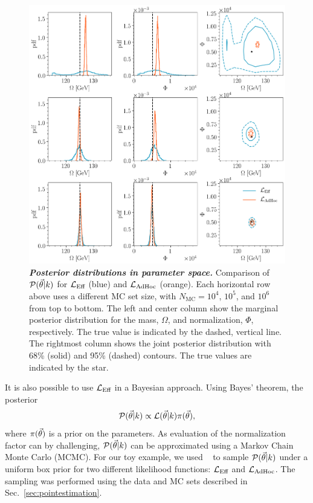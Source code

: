 \begin{figure}[ht]
\centering
    \includegraphics[width=1\linewidth]{fig/fig6}
\caption{\textbf{\textit{Posterior distributions in parameter space.}} Comparison of $\mathcal{P}(\vec{\theta}|k)$ for $\mathcal{L}_\textmd{Eff}$ (blue) and $\mathcal{L}_{\textmd{AdHoc}}$ (orange). Each horizontal row above uses a different MC set size, with $N_\mathrm{MC}=10^4$, $10^5$, and $10^6$ from top to bottom. The left and center column show the marginal posterior distribution for the mass, $\Omega$, and normalization, $\Phi$, respectively. The true value is indicated by the dashed, vertical line. The rightmost column shows the joint posterior distribution with 68\% (solid) and 95\% (dashed) contours. The true values are indicated by the star.}
\label{fig:llhdist}
\end{figure}

It is also possible to use $\mathcal{L}_\textmd{Eff}$ in a Bayesian approach. Using Bayes' theorem, the posterior
\begin{equation}
\mathcal{P}(\vec{\theta}|k) \propto \mathcal{L}(\vec{\theta}|k) \pi(\vec{\theta}),
\end{equation}
where $\pi(\vec{\theta})$ is a prior on the parameters. As evaluation of the normalization factor can by challenging, $\mathcal{P}(\vec{\theta}|k)$ can be approximated using a Markov Chain Monte Carlo (MCMC). For our toy example, we used \emcee{}~\cite{ForemanMackey:2012ig} to sample $\mathcal{P}(\vec{\theta}|k)$ under a uniform box prior for two different likelihood functions: $\mathcal{L}_\textmd{Eff}$ and $\mathcal{L}_{\textmd{AdHoc}}$. The sampling was performed using the data and MC sets described in Sec.~\ref{sec:pointestimation}.

